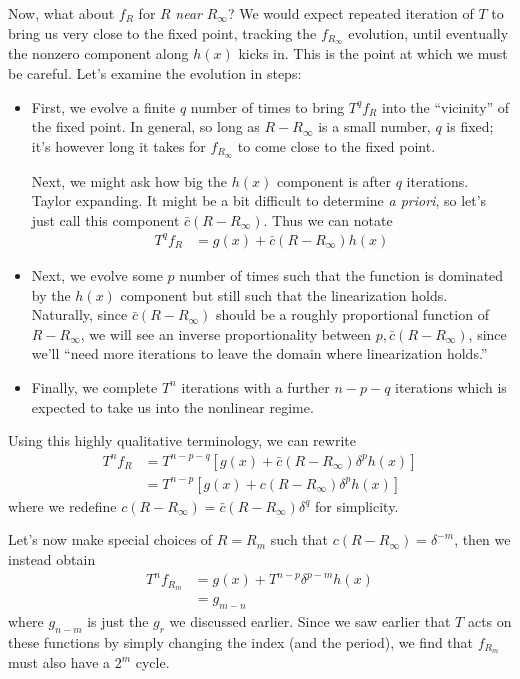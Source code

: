 \documentclass[12pt]{article}
\begin{document}
Now, what about $f_R$ for $R$ \emph{near} $R_\infty$? We would expect repeated
iteration of $T$ to bring us very close to the fixed point, tracking the
$f_{R_\infty}$ evolution, until eventually the nonzero component along $h(x)$
kicks in. This is the point at which we must be careful. Let's examine the
evolution in steps:
\begin{itemize}
    \item First, we evolve a finite $q$ number of times to bring $T^qf_R$ into
        the ``vicinity'' of the fixed point. In general, so long as $R -
        R_\infty$ is a small number, $q$ is fixed; it's however long it takes
        for $f_{R_\infty}$ to come close to the fixed point.

        Next, we might ask how big the $h(x)$ component is after $q$ iterations.
        Taylor expanding. It might be a bit difficult to determine \emph{a
        priori}, so let's just call this component $\bar{c}(R - R_\infty)$. Thus
        we can notate
        \begin{align}
            T^q f_R &= g(x) + \bar{c}(R - R_\infty)h(x)
        \end{align}

    \item Next, we evolve some $p$ number of times such that the function is
        dominated by the $h(x)$ component but still such that the linearization
        holds. Naturally, since $\bar{c}(R - R_\infty)$ should be a roughly
        proportional function of $R - R_\infty$, we will see an inverse
        proportionality between $p, \bar{c}(R - R_\infty)$, since we'll ``need
        more iterations to leave the domain where linearization holds.''

    \item Finally, we complete $T^n$ iterations with a further $n-p-q$
        iterations which is expected to take us into the nonlinear regime.
\end{itemize}

Using this highly qualitative terminology, we can rewrite
\begin{align}
    T^nf_R &= T^{n-p-q}\left[ g(x) + \bar{c}(R-R_\infty)\delta^ph(x) \right]\\
    &= T^{n-p}\left[ g(x) + c(R-R_\infty) \delta^ph(x) \right]
\end{align}
where we redefine $c(R - R_\infty) = \bar{c}(R - R_\infty)\delta^q$ for
simplicity.

Let's now make special choices of
$R = R_m$ such that $c(R - R_\infty) = \delta^{-m}$, then we instead obtain
\begin{align}
    T^nf_{R_m} &= g(x) + T^{n-p}\delta^{p-m}h(x)\\
    &= g_{m-n}
\end{align}
where $g_{n-m}$ is just the $g_r$ we discussed earlier. Since we saw earlier
that $T$ acts on these functions by simply changing the index (and the period),
we find that $f_{R_m}$ must also have a $2^m$ cycle.
\end{document}

